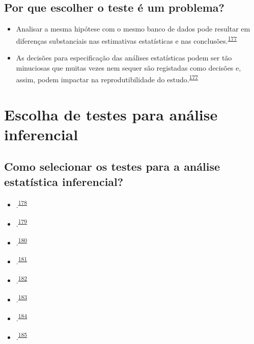\documentclass[
  a4paper,
]{book}
\begin{document}
\hypertarget{por-que-escolher-o-teste-uxe9-um-problema}{%
\subsection{Por que escolher o teste é um problema?}\label{por-que-escolher-o-teste-uxe9-um-problema}}

\begin{itemize}
\item
  Analisar a mesma hipótese com o mesmo banco de dados pode resultar em diferenças substanciais nas estimativas estatísticas e nas conclusões.\textsuperscript{\protect\hyperlink{ref-Breznau2022}{177}}
\item
  As decisões para especificação das análises estatísticas podem ser tão minuciosas que muitas vezes nem sequer são registadas como decisões e, assim, podem impactar na reprodutibilidade do estudo.\textsuperscript{\protect\hyperlink{ref-Breznau2022}{177}}
\end{itemize}

\hypertarget{escolha-analise-inferencial}{%
\section{Escolha de testes para análise inferencial}\label{escolha-analise-inferencial}}

\hypertarget{como-selecionar-os-testes-para-a-anuxe1lise-estatuxedstica-inferencial}{%
\subsection{Como selecionar os testes para a análise estatística inferencial?}\label{como-selecionar-os-testes-para-a-anuxe1lise-estatuxedstica-inferencial}}

\begin{itemize}
\item
  .\textsuperscript{\protect\hyperlink{ref-dwivedi2019}{178}}
\item
  .\textsuperscript{\protect\hyperlink{ref-Dwivedi2022}{179}}
\item
  .\textsuperscript{\protect\hyperlink{ref-Kim2017}{180}}
\item
  .\textsuperscript{\protect\hyperlink{ref-marusteri2010}{181}}
\item
  .\textsuperscript{\protect\hyperlink{ref-mishra2019}{182}}
\item
  .\textsuperscript{\protect\hyperlink{ref-ray2021}{183}}
\item
  .\textsuperscript{\protect\hyperlink{ref-nayak2011}{184}}
\item
  .\textsuperscript{\protect\hyperlink{ref-shankar2014}{185}}
\end{itemize}
\end{document}
